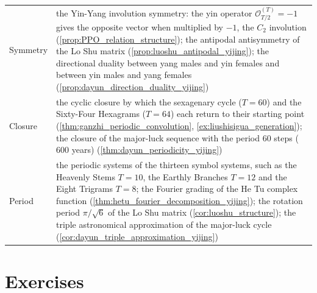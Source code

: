 \begin{longtable}{@{}>{\raggedright\arraybackslash}p{3cm}>{\raggedright\arraybackslash}p{\dimexpr\linewidth-3cm-2\tabcolsep\relax}@{}}
Symmetry & the Yin-Yang involution symmetry: the yin operator $\mathcal{O}_{T/2}^{(T)} = -1$ gives the opposite vector when multiplied by $-1$, the $C_2$ involution (\cref{prop:PPO_relation_structure}); the antipodal antisymmetry of the Lo Shu matrix (\cref{prop:luoshu_antipodal_yijing}); the directional duality between yang males and yin females and between yin males and yang females (\cref{prop:dayun_direction_duality_yijing}) \\
Closure & the cyclic closure by which the sexagenary cycle ($T=60$) and the Sixty-Four Hexagrams ($T=64$) each return to their starting point (\cref{thm:ganzhi_periodic_convolution}, \cref{ex:liushisigua_generation}); the closure of the major-luck sequence with the period $60$ steps ($600$ years) (\cref{thm:dayun_periodicity_yijing}) \\
Period & the periodic systems of the thirteen symbol systems, such as the Heavenly Stems $T=10$, the Earthly Branches $T=12$ and the Eight Trigrams $T=8$; the Fourier grading of the He Tu complex function (\cref{thm:hetu_fourier_decomposition_yijing}); the rotation period $\pi/\sqrt{6}$ of the Lo Shu matrix (\cref{cor:luoshu_structure}); the triple astronomical approximation of the major-luck cycle (\cref{cor:dayun_triple_approximation_yijing}) \\
\end{longtable}
\endgroup

\section*{Exercises}

